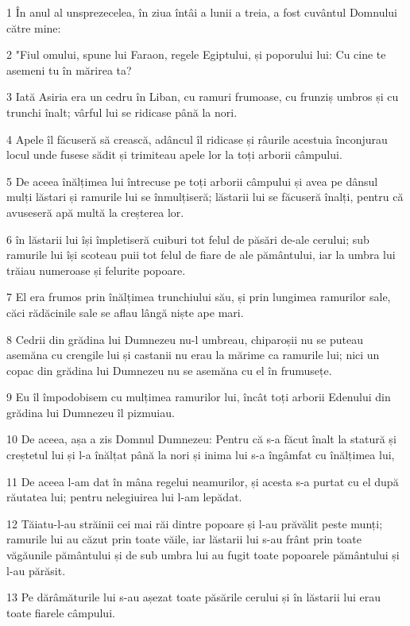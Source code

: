 \par 1 În anul al unsprezecelea, în ziua întâi a lunii a treia, a fost cuvântul Domnului către mine:
\par 2 "Fiul omului, spune lui Faraon, regele Egiptului, și poporului lui: Cu cine te asemeni tu în mărirea ta?
\par 3 Iată Asiria era un cedru în Liban, cu ramuri frumoase, cu frunziș umbros și cu trunchi înalt; vârful lui se ridicase până la nori.
\par 4 Apele îl făcuseră să crească, adâncul îl ridicase și râurile acestuia înconjurau locul unde fusese sădit și trimiteau apele lor la toți arborii câmpului.
\par 5 De aceea înălțimea lui întrecuse pe toți arborii câmpului și avea pe dânsul mulți lăstari și ramurile lui se înmulțiseră; lăstarii lui se făcuseră înalți, pentru că avuseseră apă multă la creșterea lor.
\par 6 în lăstarii lui își împletiseră cuiburi tot felul de păsări de-ale cerului; sub ramurile lui își scoteau puii tot felul de fiare de ale pământului, iar la umbra lui trăiau numeroase și felurite popoare.
\par 7 El era frumos prin înălțimea trunchiului său, și prin lungimea ramurilor sale, căci rădăcinile sale se aflau lângă niște ape mari.
\par 8 Cedrii din grădina lui Dumnezeu nu-l umbreau, chiparoșii nu se puteau asemăna cu crengile lui și castanii nu erau la mărime ca ramurile lui; nici un copac din grădina lui Dumnezeu nu se asemăna cu el în frumusețe.
\par 9 Eu îl împodobisem cu mulțimea ramurilor lui, încât toți arborii Edenului din grădina lui Dumnezeu îl pizmuiau.
\par 10 De aceea, așa a zis Domnul Dumnezeu: Pentru că s-a făcut înalt la statură și creștetul lui și l-a înălțat până la nori și inima lui s-a îngâmfat cu înălțimea lui,
\par 11 De aceea l-am dat în mâna regelui neamurilor, și acesta s-a purtat cu el după răutatea lui; pentru nelegiuirea lui l-am lepădat.
\par 12 Tăiatu-l-au străinii cei mai răi dintre popoare și l-au prăvălit peste munți; ramurile lui au căzut prin toate văile, iar lăstarii lui s-au frânt prin toate văgăunile pământului și de sub umbra lui au fugit toate popoarele pământului și l-au părăsit.
\par 13 Pe dărâmăturile lui s-au așezat toate păsările cerului și în lăstarii lui erau toate fiarele câmpului.
